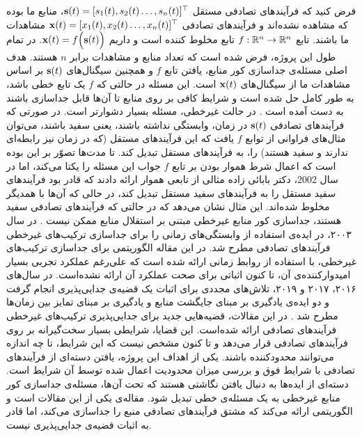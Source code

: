 \documentclass[oneside]{thesis}
\begin{document}
فرض کنید که  فرآیند‌های تصادفی‌ مستقل
$\mathbf{s}(t) = [s_1(t), s_2(t) \dots, s_n(t)]^\top$،
منابع ما بوده که مشاهده نشده‌اند و فرآیند‌های تصادفی 
$\mathbf{x}(t) = [x_1(t), x_2(t) \dots, x_n(t)]^\top$
مشاهدات ما باشند.   تابع 
$f: \mathbb{R}^n \to \mathbb{R}^n$
تابع مخلوط کننده است و داریم 
$\mathbf{x}(t) = f\Big(\mathbf{s}(t)\Big)$.
در تمام طول این پروژه، فرض شده است که تعداد منابع و مشاهدات برابر $n$ هستند. هدف اصلی مسئله‌ی جداسازی کور منابع، یافتن تابع $f$ و همچنین سیگنال‌های 
$\mathbf{s}(t)$
بر اساس مشاهدات ما از سیگنال‌های 
$\mathbf{x}(t)$
است. این مسئله در حالتی که $f$ یک تابع خطی باشد، به طور کامل حل شده است و شرایط کافی بر روی منابع تا آن‌ها قابل جداسازی باشند به دست آمده است
\cite{ICAbook}.
در حالت غیرخطی، مسئله بسیار دشوارتر است.  در صورتی که فرآیند‌های تصادفی
$\mathbf{s}(t)$
در زمان، وابستگی نداشته باشند، یعنی سفید باشند، می‌توان مثال‌‌های فراوانی از توابع $f$ یافت که این فرآیند‌های مستقل  (که در زمان نیز رابطه‌ای ندارند و 
سفید هستند) را، به فرآیند‌های مستقل تبدیل کند. تا مدت‌ها تصوّر بر این بوده است که اعمال شرط هموار بودن بر تابع 
$f$
جواب این مسئله را یکتا می‌کند، اما در سال 2002، دکتر بابائی زاده مثالی از تابعی هموار ارائه‌ دادند که قادر بود فرآیند‌های سفید مستقل را به فرآیند‌های سفید مستقل تبدیل کند، در حالی که آن‌ها با همدیگر مخلوط ‌شده‌اند. این مثال نشان می‌دهد که در حالتی که فرآیند‌های تصادفی سفید هستند، جداسازی کور منابع غیرخطی مبتنی بر استقلال منابع ممکن نیست
\cite{mbzadehthesis}.
در سال ۲۰۰۳، در
\cite{harmeling2003kernel}
ایده‌ی استفاده از وابستگی‌های زمانی را برای جداسازی ترکیب‌های غیرخطی فرآیند‌های تصادفی مطرح شد. در این مقاله‌ الگوریتمی برای جداسازی ترکیب‌های غیرخطی، با استفاده از روابط زمانی ارائه شده است که علی‌رغم عملکرد تجربی بسیار امیدوارکننده‌ی آن،  تا کنون اثباتی برای صحت عملکرد آن ارائه نشده‌است.  در سال‌های ۲۰۱۶، ۲۰۱۷ و ۲۰۱۹، تلاش‌های مجددی برای اثبات یک قضیه‌ی جدایی‌پذیری انجام گرفت و  دو ایده‌ی یادگیری بر مبنای جایگشت منابع
و یادگیری بر مبنای تمایز بین زمان‌ها 
مطرح شد
\cite{TCL, PCL, newHyva}.
در این مقالات، قضیه‌هایی جدید برای جدایی‌پذیری ترکیب‌های غیرخطی فرآیند‌های تصادفی ارائه‌ شده‌است. این قضایا، شرایطی بسیار سخت‌گیرانه بر روی فرآیند‌های تصادفی قرار می‌دهد و تا کنون مشخص نیست که این شرایط، تا چه اندازه می‌توانند محدود‌کننده باشند. یکی از اهداف این پروژه، یافتن دسته‌ای از فرآیند‌های تصادفی با شرایط فوق و بررسی میزان محدودیت اعمال شده توسط آن شرایط است. دسته‌ای از ایده‌ها به دنبال یافتن نگاشتی  هستند که تحت آن‌ها، مسئله‌ی جداسازی کور منابع غیرخطی به یک مسئله‌ی خطی تبدیل شود. مقاله‌ی 
\cite{ehsandoust}
یکی از این مقالات است و الگوریتمی ارائه می‌کند که مشتق فرآیند‌های تصادفی منبع را جداسازی می‌کند، اما قادر به اثبات قضیه‌ی جدایی‌پذیری نیست. 
\end{document}
